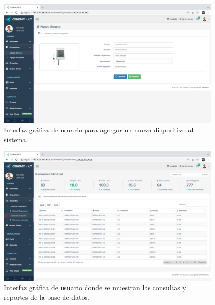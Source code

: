 
\begin{landscape} %
\begin{figure}[htpb]
\centering 
\includegraphics[width=1.55\textwidth]{./Figures/gui/4.png}
\caption{Interfaz gráfica de usuario para agregar un nuevo dispositivo al sistema.}
\label{fig:gui4}
\end{figure}
\end{landscape} %


\begin{landscape} %
\begin{figure}[htpb]
\centering 
\includegraphics[width=1.5\textwidth]{./Figures/gui/5.png}
\caption{Interfaz gráfica de usuario donde se muestran las consultas y reportes de la base de datos.}
\label{fig:gui5}
\end{figure}
\end{landscape} %

